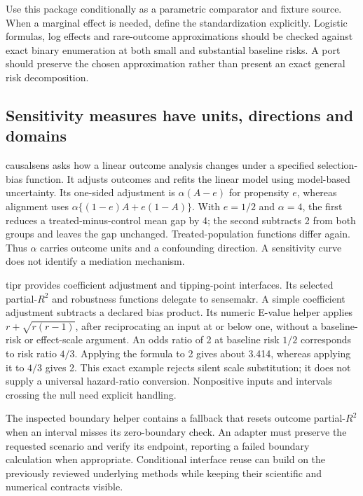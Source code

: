 Use this package conditionally as a parametric comparator and fixture source.
When a marginal effect is needed, define the standardization explicitly.
Logistic formulas, log effects and rare-outcome approximations should be checked
against exact binary enumeration at both small and substantial baseline risks.
A port should preserve the chosen approximation rather than present an exact
general risk decomposition. \citep{exec25_rmed_choice}

\subsection{Sensitivity measures have units, directions and domains}

causalsens asks how a linear outcome analysis changes under a specified
selection-bias function. It adjusts outcomes and refits the linear model using
model-based uncertainty. Its one-sided adjustment is $\alpha(A-e)$ for
propensity $e$, whereas alignment uses
$\alpha\{(1-e)A+e(1-A)\}$. With $e=1/2$ and $\alpha=4$, the first reduces a
treated-minus-control mean gap by 4; the second subtracts 2 from both groups
and leaves the gap unchanged. Treated-population functions differ again.
Thus $\alpha$ carries outcome units and a confounding direction. A sensitivity
curve does not identify a mediation mechanism. \citep{exec25_rmed_causalsens,exec25_rmed_choice}

tipr provides coefficient adjustment and tipping-point interfaces. Its selected
partial-$R^2$ and robustness functions delegate to sensemakr. A simple coefficient
adjustment subtracts a declared bias product. Its numeric E-value helper applies
$r+\sqrt{r(r-1)}$, after reciprocating an input at or below one, without a
baseline-risk or effect-scale argument. An odds ratio of 2 at baseline risk
$1/2$ corresponds to risk ratio $4/3$. Applying the formula to 2 gives about
3.414, whereas applying it to $4/3$ gives 2. This exact example rejects silent
scale substitution; it does not supply a universal hazard-ratio conversion.
Nonpositive inputs and intervals crossing the null need explicit handling.
\citep{exec25_rmed_tipr,exec25_rmed_choice}

The inspected boundary helper contains a fallback that resets outcome
partial-$R^2$ when an interval misses its zero-boundary check. An adapter must
preserve the requested scenario and verify its endpoint, reporting a failed
boundary calculation when appropriate. Conditional interface reuse can build
on the previously reviewed underlying methods while keeping their scientific
and numerical contracts visible. \citep{exec25_rmed_tipr,exec25_rmed_choice}


